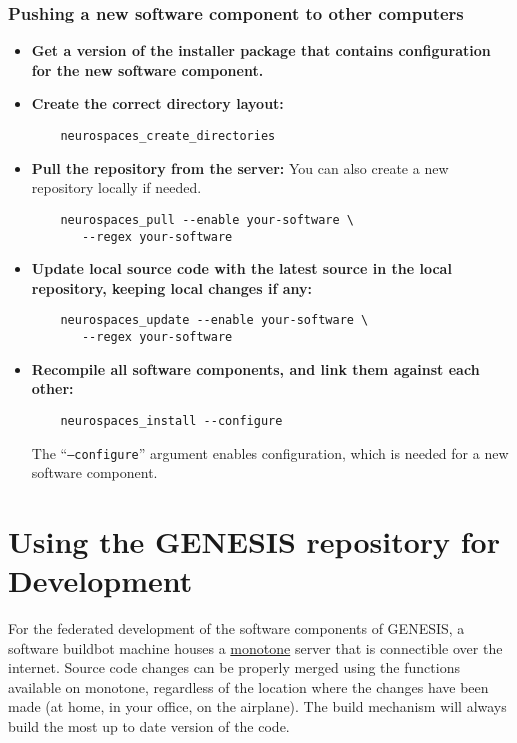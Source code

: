 \documentclass[12pt]{article}
\begin{document}
\subsubsection*{Pushing a new software component to other computers}

\begin{itemize}

	\item {\bf Get a version of the installer package that contains configuration for the new software component.}
	
	\item {\bf Create the correct directory layout:}
	\begin{verbatim}
	neurospaces_create_directories
	\end{verbatim}

	\item {\bf Pull the repository from the server:} You can also create a new repository locally if needed.
	\begin{verbatim}
	neurospaces_pull --enable your-software \
	   --regex your-software
	\end{verbatim}
	
	\item {\bf Update local source code with the latest source in the local repository, keeping local changes if any:}
	\begin{verbatim}
	neurospaces_update --enable your-software \
	   --regex your-software
	\end{verbatim}
	
	\item {\bf Recompile all software components, and link them against each other:} 
	\begin{verbatim}
	neurospaces_install --configure
	\end{verbatim}
	The ``{\tt --configure}'' argument enables configuration, which is needed for a new software component.
\end{itemize}

\section*{Using the GENESIS repository for Development}

For the federated development of the software components of GENESIS, a software buildbot machine houses a \href{http://monotone.ca/}{monotone} server that is connectible over the internet. Source code changes can be properly merged using the functions available on monotone, regardless of the location where the changes have been made (at home, in your office, on the airplane). The build mechanism will always build the most up to date version of the code.
\end{document}
